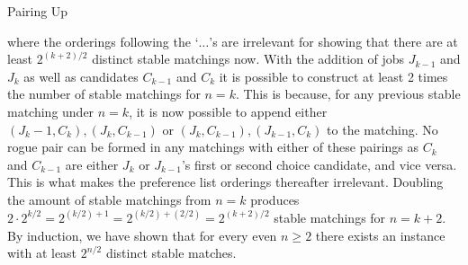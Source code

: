 \begin{homeworkProblem}{Pairing Up}
\begin{itemize}
        where the orderings following the `$\dots$'s are irrelevant for showing that there are at least $2^{(k+2)/2}$ distinct stable matchings now. With the addition of jobs $J_{k-1}$ and $J_k$ as well as candidates $C_{k-1}$ and $C_k$ it is possible to construct at least 2 times the number of stable matchings for $n=k$. This is because, for any previous stable matching under $n=k$, it is now possible to append either $(J_k-1, C_k), (J_k, C_{k-1})$ or $(J_k, C_{k-1}), (J_{k-1}, C_k)$ to the matching. No rogue pair can be formed in any matchings with either of these pairings as $C_k$ and $C_{k-1}$ are either $J_k$ or $J_{k-1}$'s first or second choice candidate, and vice versa. This is what makes the preference list orderings thereafter irrelevant. Doubling the amount of stable matchings from $n=k$ produces $2 \cdot 2^{k/2} = 2^{(k/2)+1}=2^{(k/2) + (2/2)} = 2^{(k+2)/2}$ stable matchings for $n=k+2$. By induction, we have shown that for every even $n \geq 2$ there exists an instance with at least $2^{n/2}$ distinct stable matches. 
        
    \end{itemize}

    



\end{homeworkProblem}
